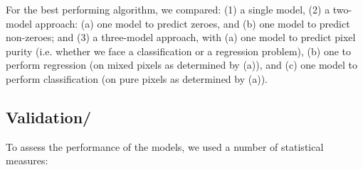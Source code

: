 \documentclass[review,authoryear,3p]{elsarticle}
\begin{document}
For the best performing algorithm, we compared: (1) a single model, (2) a two-model approach: (a) one model to predict zeroes, and (b) one model to predict non-zeroes; and (3) a three-model approach, with (a) one model to predict pixel purity (i.e. whether we face a classification or a regression problem), (b) one to perform regression (on mixed pixels as determined by (a)), and (c) one model to perform classification (on pure pixels as determined by (a)).


\subsection{Validation/}

To assess the performance of the models, we used a number of statistical measures:
\end{document}
